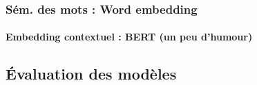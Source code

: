 \documentclass[xcolor=table]{beamer}
\begin{document}
%
%	
%
%	
%	

\begin{frame}
\frametitle{Sém. des mots : Word embedding}
\framesubtitle{Embedding contextuel : BERT (un peu d'humour)}
	\vspace{-3pt}
	\begin{center}
	\end{center}
	
\end{frame}


\subsection{Évaluation des modèles}
\end{document}
